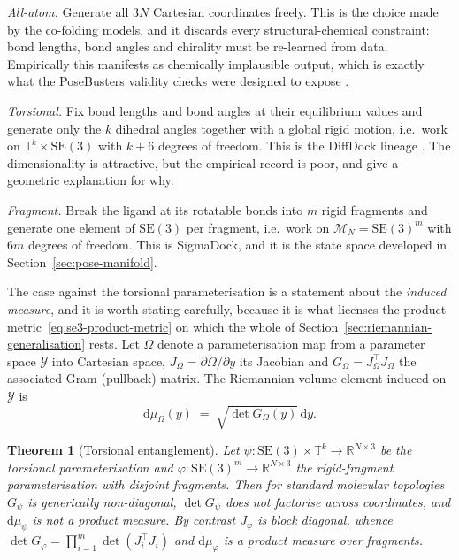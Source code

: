 \documentclass[a4paper,12pt]{article}
\newtheorem{theorem}{Theorem}[section]
\theoremstyle{remark}
\begin{document}
\emph{All-atom.} Generate all $3N$ Cartesian coordinates freely. This is the choice made by the
co-folding models, and it discards every structural-chemical constraint: bond lengths, bond angles
and chirality must be re-learned from data. Empirically this manifests as chemically implausible
output, which is exactly what the PoseBusters validity checks were designed to expose
\cite{bortoliRiemannianScoreBasedGenerative2022}.

\emph{Torsional.} Fix bond lengths and bond angles at their equilibrium values and generate only
the $k$ dihedral angles together with a global rigid motion, i.e.\ work on
$\mathbb{T}^{k} \times \mathrm{SE}(3)$ with $k+6$ degrees of freedom. This is the DiffDock lineage
\cite{bortoliRiemannianScoreBasedGenerative2022}. The dimensionality is attractive, but the empirical record is poor, and
\cite{bortoliRiemannianScoreBasedGenerative2022} give a geometric explanation for why.

\emph{Fragment.} Break the ligand at its rotatable bonds into $m$ rigid fragments and generate one
element of $\mathrm{SE}(3)$ per fragment, i.e.\ work on $\mathcal{M}_N = \mathrm{SE}(3)^m$ with
$6m$ degrees of freedom. This is SigmaDock, and it is the state space developed in
Section~\ref{sec:pose-manifold}.

The case against the torsional parameterisation is a statement about the \emph{induced measure},
and it is worth stating carefully, because it is what licenses the product metric~\eqref{eq:se3-product-metric}
on which the whole of Section~\ref{sec:riemannian-generalisation} rests. Let $\Omega$ denote a
parameterisation map from a parameter space $\mathcal{Y}$ into Cartesian space, $J_\Omega = \partial\Omega/\partial y$
its Jacobian and $G_\Omega = J_\Omega^{\top} J_\Omega$ the associated Gram (pullback) matrix. The
Riemannian volume element induced on $\mathcal{Y}$ is
\[
  \mathrm{d}\mu_\Omega(y) \;=\; \sqrt{\det G_\Omega(y)}\, \mathrm{d}y .
\]

\begin{theorem}[Torsional entanglement]
\label{thm:entanglement}
Let $\psi : \mathrm{SE}(3) \times \mathbb{T}^{k} \to \mathbb{R}^{N \times 3}$ be the torsional
parameterisation and $\varphi : \mathrm{SE}(3)^m \to \mathbb{R}^{N \times 3}$ the rigid-fragment
parameterisation with disjoint fragments. Then for standard molecular topologies $G_\psi$ is
generically non-diagonal, $\det G_\psi$ does not factorise across coordinates, and
$\mathrm{d}\mu_\psi$ is not a product measure. By contrast $J_\varphi$ is block diagonal, whence
$\det G_\varphi = \prod_{i=1}^{m} \det (J_i^\top J_i)$ and $\mathrm{d}\mu_\varphi$ is a product
measure over fragments.
\end{theorem}
\end{document}
